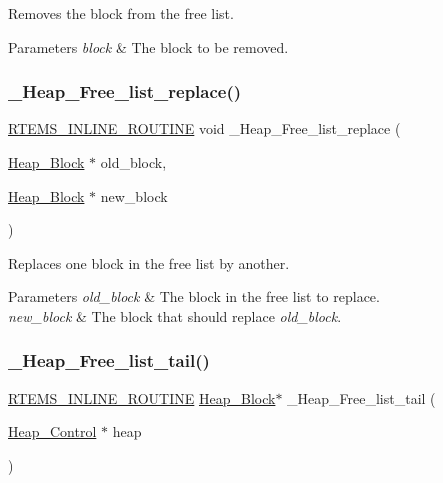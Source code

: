 Removes the block from the free list. 


\begin{DoxyParams}{Parameters}
{\em block} & The block to be removed. \\
\hline
\end{DoxyParams}
\mbox{\label{group__RTEMSScoreHeap_gade52dd12ae2cb6570271313e8bd7fdf7}} 
\subsubsection{\texorpdfstring{\_Heap\_Free\_list\_replace()}{\_Heap\_Free\_list\_replace()}}
{\footnotesize\ttfamily \mbox{\hyperlink{group__RTEMSScoreBaseDefs_gac216239df231d5dbd15e3520b0b9313f}{R\+T\+E\+M\+S\+\_\+\+I\+N\+L\+I\+N\+E\+\_\+\+R\+O\+U\+T\+I\+NE}} void \+\_\+\+Heap\+\_\+\+Free\+\_\+list\+\_\+replace (\begin{DoxyParamCaption}\item[{\mbox{\hyperlink{structHeap__Block}{Heap\+\_\+\+Block}} $\ast$}]{old\+\_\+block,  }\item[{\mbox{\hyperlink{structHeap__Block}{Heap\+\_\+\+Block}} $\ast$}]{new\+\_\+block }\end{DoxyParamCaption})}



Replaces one block in the free list by another. 


\begin{DoxyParams}{Parameters}
{\em old\+\_\+block} & The block in the free list to replace. \\
\hline
{\em new\+\_\+block} & The block that should replace {\itshape old\+\_\+block}. \\
\hline
\end{DoxyParams}
\mbox{\label{group__RTEMSScoreHeap_gad25276de4aa987568f1bfc66a0c66700}} 
\subsubsection{\texorpdfstring{\_Heap\_Free\_list\_tail()}{\_Heap\_Free\_list\_tail()}}
{\footnotesize\ttfamily \mbox{\hyperlink{group__RTEMSScoreBaseDefs_gac216239df231d5dbd15e3520b0b9313f}{R\+T\+E\+M\+S\+\_\+\+I\+N\+L\+I\+N\+E\+\_\+\+R\+O\+U\+T\+I\+NE}} \mbox{\hyperlink{structHeap__Block}{Heap\+\_\+\+Block}}$\ast$ \+\_\+\+Heap\+\_\+\+Free\+\_\+list\+\_\+tail (\begin{DoxyParamCaption}\item[{\mbox{\hyperlink{structHeap__Control}{Heap\+\_\+\+Control}} $\ast$}]{heap }\end{DoxyParamCaption})}



